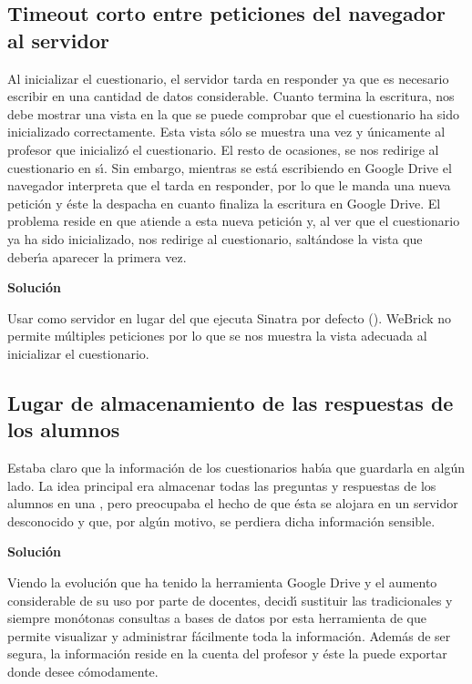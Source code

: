 \subsection{Timeout corto entre peticiones del navegador al servidor}
\label{subsec:4.1.1}
\bigskip

Al inicializar el cuestionario, el servidor tarda en responder ya que es necesario escribir en  una cantidad de datos considerable. Cuanto termina la escritura, 
nos debe mostrar una vista en la que se puede comprobar que el cuestionario ha sido inicializado correctamente. Esta vista s\'olo se muestra una vez y \'unicamente al profesor
que inicializ\'o el cuestionario. El resto de ocasiones, se nos redirige al cuestionario en s\'{\i}. 
Sin embargo, mientras se est\'a escribiendo en Google Drive el navegador interpreta que el  tarda en responder, por lo que le manda una nueva petici\'on  y \'este la 
despacha en cuanto finaliza la escritura en Google Drive. El problema reside en que atiende a esta nueva petici\'on y, al ver que el cuestionario ya ha sido inicializado,
nos redirige al cuestionario, salt\'andose la vista que deber\'{\i}a aparecer la primera vez.
\bigskip

{\normalsize {\bfseries Soluci\'on}}
\bigskip

Usar como servidor  en lugar del que ejecuta Sinatra por defecto (). WeBrick no permite m\'ultiples peticiones por lo que se nos muestra la 
vista adecuada al inicializar el cuestionario.

\subsection{Lugar de almacenamiento de las respuestas de los alumnos}
\label{subsec:4.1.2}
\bigskip

Estaba claro que la informaci\'on de los cuestionarios hab\'{\i}a que guardarla en alg\'un lado. La idea principal era almacenar todas las preguntas y respuestas de los alumnos
en una , pero preocupaba el hecho de que \'esta se alojara en un servidor desconocido y que, por alg\'un motivo, se perdiera dicha informaci\'on sensible.
\bigskip

{\normalsize {\bfseries Soluci\'on}}
\bigskip

Viendo la evoluci\'on que ha tenido la herramienta Google Drive y el aumento considerable de su uso por parte de docentes, decid\'{\i} sustituir las tradicionales y siempre mon\'otonas 
consultas a bases de datos por esta herramienta de  que permite visualizar y administrar f\'acilmente toda la informaci\'on. Adem\'as de ser segura, la informaci\'on 
reside en la cuenta del profesor y \'este la puede exportar donde desee c\'omodamente.

